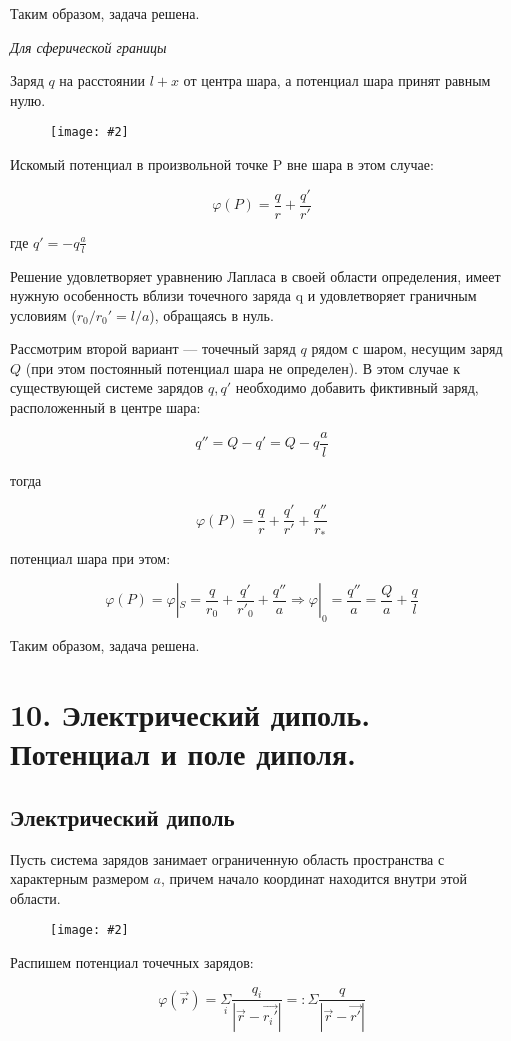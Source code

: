 \documentclass[a4paper,12pt]{article}
\newcommand{\kr}[1]{\textit{#1}}
\newcommand{\fc}[1]{\[#1\]}
\newcommand{\imc}[2][0.7\textwidth]{%
    \begin{figure}[h!]
        \centering
        \texttt{[image: \#2]}
    \end{figure}%
}
\begin{document}
Таким образом, задача решена.



\kr{Для сферической границы}

Заряд $q$ на расстоянии $l+x$ от центра шара, а потенциал шара принят равным нулю. 

\imc[0.55\textwidth]{15.png}

Искомый потенциал в
произвольной точке P вне шара в этом случае:

\fc{\varphi(P)=\frac{q}{r}+\frac{q'}{r'}}

где $q'=-q\frac{a}{l}$

\newpage

 Решение удовлетворяет уравнению Лапласа в своей области определения, имеет нужную особенность вблизи точечного заряда q и удовлетворяет граничным условиям ($r_0/r_0'=l/a$), обращаясь в нуль.
 
Рассмотрим второй вариант — точечный заряд $q$ рядом с шаром,
несущим заряд $Q$ (при этом постоянный потенциал шара не определен). В этом случае к существующей системе зарядов $q,q'$ необходимо добавить фиктивный заряд, расположенный в центре шара:

\fc{q''=Q-q'=Q-q\frac{a}{l}}

тогда 

\fc{\varphi(P)=\frac{q}{r}+\frac{q'}{r'}+\frac{q''}{r_*}}

потенциал шара при этом:

\fc{\varphi(P)=\varphi|_S =\frac{q}{r_0}+\frac{q'}{r'_0}+\frac{q''}{a}\Rightarrow \varphi|_0=\frac{q''}{a}=\frac{Q}{a}+\frac{q}{l}}

Таким образом, задача решена.

\section*{10. Электрический диполь. Потенциал и поле диполя.}

\subsection*{Электрический диполь}

Пусть система зарядов занимает ограниченную область пространства с характерным размером $a$, причем начало координат находится внутри этой области.

\imc[0.5\textwidth]{16.png}

Распишем потенциал точечных зарядов:

\fc{\varphi(\vec{r})=\underset{i}{\Sigma}\frac{q_i}{|\vec{r}-\vec{r_i'}|}=:\Sigma \frac{q}{|\vec{r}-\vec{r'}|}}
\end{document}
